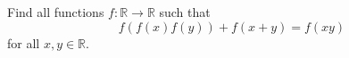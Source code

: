 Find all functions $f \colon \mathbb{R} \to \mathbb{R}$ such that
\[
f(f(x)f(y)) + f(x+y) = f(xy)
\]
for all $x, y \in \mathbb{R}$.
